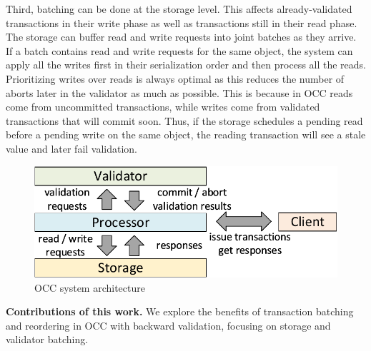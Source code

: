 Third, batching can be done at the storage level. This affects
already-validated transactions in their write phase as well as transactions
still in their read phase. The storage can buffer read and write requests into
joint batches as they arrive. If a batch contains read and write requests for
the same object, the system can apply all the writes first in their serialization
order and then process all the reads. Prioritizing writes over reads is always
optimal as this reduces the number of aborts later in the validator as much as possible. This is
because in OCC reads come from uncommitted transactions, while writes come from
validated transactions that will commit soon. Thus, if the storage schedules a
pending read before a pending write on the same object, the reading transaction
will see a stale value and later fail validation. 


\begin{figure}[t]
 \centering
 \includegraphics[width=0.9\columnwidth]{figures/arch.pdf}
 \caption{OCC system architecture}
 \label{fig:occ_arch}
\end{figure}


{\bf Contributions of this work.}
We explore the benefits of transaction batching and reordering in OCC with backward validation, focusing on storage and validator batching. 

